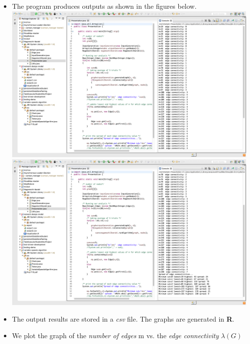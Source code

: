\documentclass[12pt,letterpaper,titlepage,en-US]{article}
\begin{document}
\begin{itemize}


\item The program produces outputs as shown in the figures below.\\

 \includegraphics[scale=0.32]{fig/photo1.png}\\
 
  \includegraphics[scale=0.32]{fig/photo2.png}\\
 
\item The output results are stored in a \textit{csv} file. The graphs are generated in \textbf{R}.

\item We plot the graph of the \textit{number of edges} m vs. the \textit{edge connectivity} $\lambda(G)$


\end{itemize}
\end{document}
